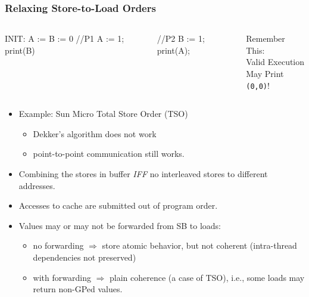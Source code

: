 \documentclass{beamer}
\newcommand{\emp}[1]{\textcolor{DikuRed}{ #1}}
\begin{document}
\begin{frame}[fragile,t]
\frametitle{Relaxing Store-to-Load Orders}


\begin{columns}
\begin{colorcode}[fontsize=\large]
  INIT: A := B := 0
//P1
A := 1;
print(B)
\end{colorcode} 
\begin{colorcode}[fontsize=\large]

//P2
B := 1;
print(A);
\end{colorcode} 
\alert{Remember This:\\Valid Execution\\May Print {\tt (0,0)}!}
\end{columns}
\bigskip

\begin{itemize}
    \item Example: Sun Micro Total Store Order (TSO)
        \begin{itemize}
            \item Dekker's algorithm does not work
            \item point-to-point communication still works.
        \end  {itemize}\smallskip

    \item Combining the stores in buffer {\em IFF} 
            no interleaved stores to different addresses.\smallskip

    \item Accesses to cache are submitted out of program order.\smallskip

    \item Values may or may not be forwarded from SB to loads:  
        \begin{itemize}
            \item no forwarding $\Rightarrow$ \emp{store atomic behavior}, but \alert{not coherent} 
                    (intra-thread dependencies not preserved)
            \item with forwarding $\Rightarrow$ plain coherence (a case of TSO),
                    i.e., some loads may return non-GPed values.  
        \end  {itemize}
\end{itemize}

\end{frame}
\end{document}
